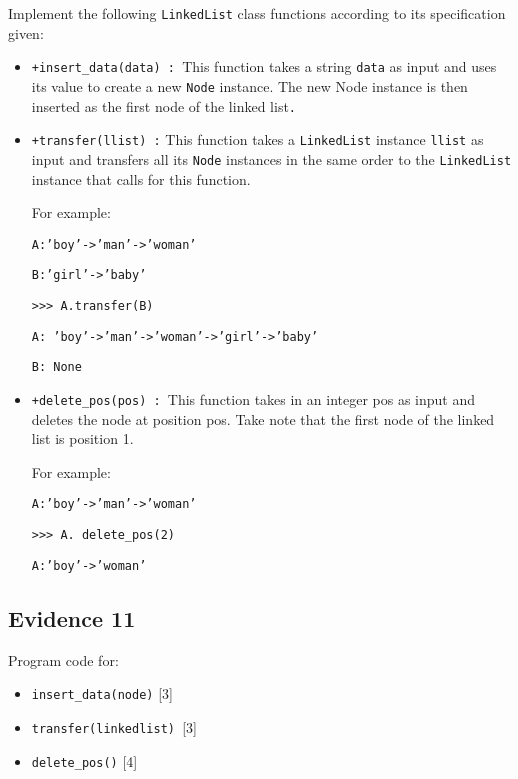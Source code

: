 Implement the following \texttt{LinkedList} class functions according
to its specification given: 
\begin{itemize}
\item \texttt{+insert\_data(data) : }This function takes a string \texttt{data}
as input and uses its value to create a new \texttt{Node} instance.
The new Node instance is then inserted as the first node of the linked
list\texttt{.}
\item \texttt{+transfer(llist) :} This function takes a \texttt{LinkedList}
instance \texttt{llist} as input and transfers all its \texttt{Node}
instances in the same order to the \texttt{LinkedList} instance that
calls for this function. 

For example: 

\noindent\begin{minipage}[t]{1\columnwidth}%
\texttt{A:'boy'->'man'->'woman'}

\texttt{B:'girl'->'baby' }

\texttt{>\textcompwordmark >\textcompwordmark > A.transfer(B) }

\texttt{A: 'boy'->'man'->'woman'->'girl'->'baby'}

\texttt{B: None}%
\end{minipage}
\item \texttt{+delete\_pos(pos) : }This function takes in an integer pos
as input and deletes the node at position pos. Take note that the
first node of the linked list is position 1.

For example: 

\noindent\begin{minipage}[t]{1\columnwidth}%
\texttt{A:'boy'->'man'->'woman' }

\texttt{>\textcompwordmark >\textcompwordmark > A. delete\_pos(2) }

\texttt{A:'boy'->'woman'}%
\end{minipage}
\end{itemize}

\subsection*{Evidence 11 }

Program code for: 
\begin{itemize}
\item \texttt{insert\_data(node)} \hfill{}{[}3{]}
\item \texttt{transfer(linkedlist) }\hfill{}{[}3{]}
\item \texttt{delete\_pos()}\hfill{} {[}4{]}
\end{itemize}